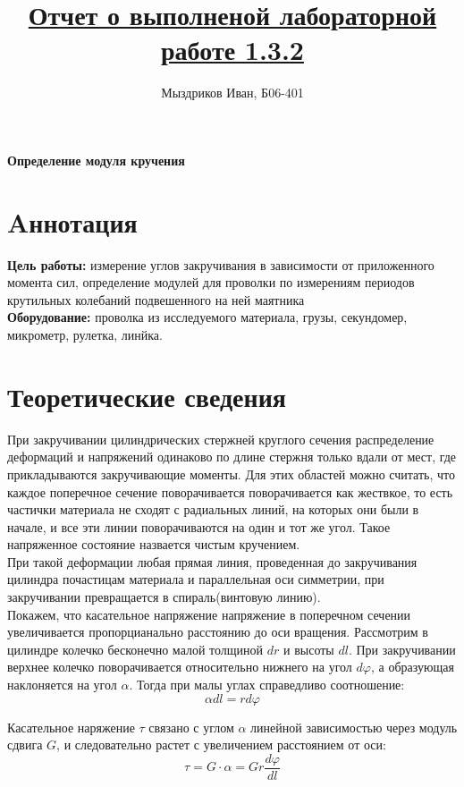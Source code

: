 \documentclass[a4paper]{article}
\title{\underline{Отчет о выполненой лабораторной работе 1.3.2}}
\author{Мыздриков Иван, Б06-401}
\begin{document}
\maketitle
\begin{center}
\Large{\textbf{Определение модуля кручения}}
\end{center}
\section{Aннотация}
\textbf{Цель работы: }измерение углов закручивания в зависимости от приложенного момента
сил, определение модулей для проволки по измерениям периодов крутильных колебаний подвешенного на
ней маятника\\
\textbf{Оборудование: }проволка из исследуемого материала,
грузы, секундомер, микрометр, рулетка, линйка.
\section{Теоретические сведения}
При закручивании цилиндрических стержней круглого сечения распределение деформаций
 и напряжений одинаково по длине стержня только вдали от мест, где прикладываются закручивающие моменты.
Для этих областей можно считать, что каждое поперечное сечение поворачивается поворачивается как жествкое,
то есть частички материала не сходят с радиальных линий, на которых они были в начале, и все
эти линии поворачиваются на один и тот же угол. Такое напряженное состояние назвается чистым кручением.\\

При такой деформации любая прямая линия, проведенная до закручивания цилиндра почастицам материала и параллельная оси симметрии,
при закручивании превращается в спираль(винтовую линию). \\

Покажем, что касательное напряжение напряжение в поперечном сечении увеличивается пропорцианально
 расстоянию до оси вращения.
Рассмотрим в цилиндре колечко бесконечно малой толщиной $dr$ и высоты $dl$. При закручивании верхнее колечко поворачивается относительно 
нижнего на угол $d\varphi$, а образующая наклоняется на угол $\alpha$. Тогда при малы углах справедливо соотношение:
\begin{equation}
    \alpha dl= r d\varphi 
\end{equation}

Касательное наряжение $\tau $ связано с углом $\alpha$ линейной зависимостью через модуль сдвига $G$,
 и следовательно растет с увеличением расстоянием от оси:
\begin{equation}
    \tau = G\cdot \alpha =Gr\frac{d\varphi}{dl} 
\end{equation}
\end{document}
